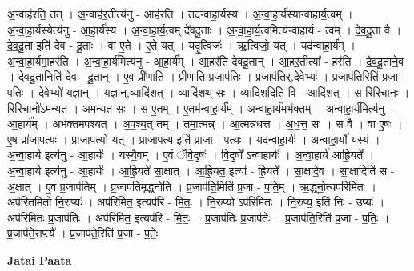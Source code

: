 \documentclass[17pt]{extarticle}
\begin{document}
अ॒न्वाह॑रति॒ तत् । अ॒न्वाह॑र॒तीत्य॑नु - आह॑रति । तद॑न्वाहा॒र्य॑स्य । अ॒न्वा॒हा॒र्य॑स्यान्वाहार्य॒त्वम् । अ॒न्वा॒हा॒र्य॑स्येत्य॑नु - आ॒हा॒र्य॑स्य । अ॒न्वा॒हा॒र्य॒त्वम् दे॑वदू॒ताः । अ॒न्वा॒हा॒र्य॒त्वमित्य॑न्वाहार्य - त्वम् । दे॒व॒दू॒ता वै । दे॒व॒दू॒ता इति॑ देव - दू॒ताः । वा ए॒ते । ए॒ते यत् । यदृ॒त्विजः॑ । ऋ॒त्विजो॒ यत् । यद॑न्वाहा॒र्य᳚म् । अ॒न्वा॒हा॒र्य॑मा॒हर॑ति । अ॒न्वा॒हा॒र्य॑मित्य॑नु - आ॒हा॒र्य᳚म् । आ॒हर॑ति देवदू॒तान् । आ॒हर॒तीत्या᳚ - हर॑ति । दे॒व॒दू॒ताने॒व । दे॒व॒दू॒तानिति॑ देव - दू॒तान् । ए॒व प्री॑णाति । प्री॒णा॒ति॒ प्र॒जाप॑तिः । प्र॒जाप॑तिर्,दे॒वेभ्यः॑ । प्र॒जाप॑ति॒रिति॑ प्र॒जा - प॒तिः॒ । दे॒वेभ्यो॑ य॒ज्ञान् । य॒ज्ञान्,व्यादि॑शत् । व्यादि॑श॒थ् सः । व्यादि॑श॒दिति॑ वि - आदि॑शत् । स रि॑रिचा॒नः । रि॒रि॒चा॒नो॑ऽमन्यत । अ॒म॒न्य॒त॒ सः । स ए॒तम् । ए॒तम॑न्वाहा॒र्य᳚म् । अ॒न्वा॒हा॒र्य॑मभ॑क्तम् । अ॒न्वा॒हा॒र्य॑मित्य॑नु - आ॒हा॒र्य᳚म् । अभ॑क्तमपश्यत् । अ॒प॒श्य॒त् तम् । तमा॒त्मन्न् । आ॒त्मन्न॑धत्त । अ॒ध॒त्त॒ सः । स वै । वा ए॒षः । ए॒ष प्रा॑जाप॒त्यः । प्रा॒जा॒प॒त्यो यत् । प्रा॒जा॒प॒त्य इति॑ प्राजा - प॒त्यः । यद॑न्वाहा॒र्यः॑ । अ॒न्वा॒हा॒र्यो॑ यस्य॑ । अ॒न्वा॒हा॒र्य॑ इत्य॑नु - आ॒हा॒र्यः॑ । यस्यै॒वम् । ए॒वं ॅवि॒दुषः॑ । वि॒दुषो᳚ ऽन्वाहा॒र्यः॑ । अ॒न्वा॒हा॒र्य॑ आह्रि॒यते᳚ । अ॒न्वा॒हा॒र्य॑ इत्य॑नु - आ॒हा॒र्यः॑ । आ॒ह्रि॒यते॑ सा॒क्षात् । आ॒ह्रि॒यत॒ इत्या᳚ - ह्रि॒यते᳚ । सा॒क्षादे॒व । सा॒क्षादिति॑ स - अ॒क्षात् । ए॒व प्र॒जाप॑तिम् । प्र॒जाप॑तिमृद्ध्नोति । प्र॒जाप॑ति॒मिति॑ प्र॒जा - प॒ति॒म् । ऋ॒द्ध्नो॒त्यप॑रिमितः । अप॑रितमितो नि॒रुप्यः॑ । अप॑रिमित॒ इत्यप॑रि - मि॒तः॒ । नि॒रुप्यो ऽप॑रिमितः । नि॒रुप्य॒ इति॑ निः - उप्यः॑ । अप॑रिमितः प्र॒जाप॑तिः । अप॑रिमित॒ इत्यप॑रि - मि॒तः॒ । प्र॒जाप॑तिः प्र॒जाप॑तेः । प्र॒जाप॑ति॒रिति॑ प्र॒जा - प॒तिः॒ । प्र॒जाप॑ते॒राप्त्यै᳚ । प्र॒जाप॑ते॒रिति॑ प्र॒जा - प॒तेः॒ \newline

\textbf{Jatai Paata} \newline
\end{document}

